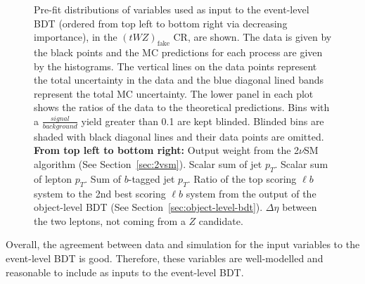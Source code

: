 \begin{figure}[htbp]
\caption{Pre-fit distributions of variables used as input to the event-level BDT (ordered from top left to bottom right via decreasing importance), in the $(tWZ)_{\text{fake}}$ CR, are shown. The data is given by the black points and the MC predictions for each process are given by the histograms. The vertical lines on the data points represent the total uncertainty in the data and the blue diagonal lined bands represent the total MC uncertainty. The lower panel in each plot shows the ratios of the data to the theoretical predictions. Bins with a $\frac{signal}{background}$ yield greater than 0.1 are kept blinded. Blinded bins are shaded with black diagonal lines and their data points are omitted. \textbf{From top left to bottom right:} Output weight from the 2$\nu$SM algorithm (See Section~\ref{sec:2vsm}). Scalar sum of jet $p_{T}$. Scalar sum of lepton $p_{T}$. Sum of $b$-tagged jet $p_{T}$. Ratio of the top scoring $\ell b$ system to the 2nd best scoring $\ell b$ system from the output of the object-level BDT (See Section~\ref{sec:object-level-bdt}). $\Delta \eta$ between the two leptons, not coming from a $Z$ candidate.}
  \label{fig:4lep-tWZfakeCR-eventbdt-vars}
\end{figure}

Overall, the agreement between data and simulation for the input variables to the event-level BDT is good. Therefore, these variables are well-modelled and reasonable to include as inputs to the event-level BDT.

